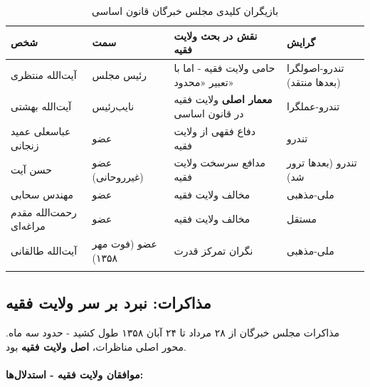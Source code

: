 \documentclass[12pt,a4paper]{book}
\newcommand{\keyword}[1]{\textbf{\textcolor{cPrimary}{#1}}}
\begin{document}
\begin{longtable}{%
    >{\raggedleft\arraybackslash}p{}
    >{\raggedleft\arraybackslash}p{}
    >{\raggedleft\arraybackslash}p{}
    >{\raggedleft\arraybackslash}p{}}
\toprule
\rowcolor{cPrimary!10}
\textbf{شخص} & \textbf{سمت} & \textbf{نقش در بحث ولایت فقیه} & \textbf{گرایش} \\
\midrule
\endhead

آیت‌الله منتظری &
رئیس مجلس &
حامی ولایت فقیه - اما با تعبیر «محدود» &
تندرو-اصولگرا (بعدها منتقد) \\
\midrule

آیت‌الله بهشتی &
نایب‌رئیس &
\keyword{معمار اصلی} ولایت فقیه در قانون اساسی &
تندرو-عملگرا \\
\midrule

عباسعلی عمید زنجانی &
عضو &
دفاع فقهی از ولایت فقیه &
تندرو \\
\midrule

حسن آیت &
عضو (غیرروحانی) &
مدافع سرسخت ولایت فقیه &
تندرو (بعدها ترور شد) \\
\midrule

مهندس سحابی &
عضو &
مخالف ولایت فقیه &
ملی-مذهبی \\
\midrule

رحمت‌الله مقدم مراغه‌ای &
عضو &
مخالف ولایت فقیه &
مستقل \\
\midrule

آیت‌الله طالقانی &
عضو (فوت مهر ۱۳۵۸) &
نگران تمرکز قدرت &
ملی-مذهبی \\

\bottomrule
\caption{بازیگران کلیدی مجلس خبرگان قانون اساسی}
\label{tab:experts-actors}
\end{longtable}

\subsection{مذاکرات: نبرد بر سر ولایت فقیه}

مذاکرات مجلس خبرگان از ۲۸ مرداد تا ۲۴ آبان ۱۳۵۸ طول کشید - حدود سه ماه. محور اصلی مناظرات، \keyword{اصل ولایت فقیه} بود.

\paragraph{موافقان ولایت فقیه - استدلال‌ها:}
\end{document}
